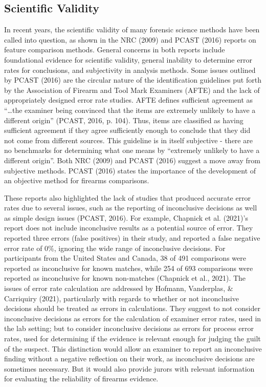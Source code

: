 \documentclass[print]{nuthesis}
\begin{document}
\hypertarget{scientific-validity}{%
\subsection{Scientific Validity}\label{scientific-validity}}

In recent years, the scientific validity of many forensic science methods have been called into question, as shown in the NRC (2009) and PCAST (2016) reports on feature comparison methods.
General concerns in both reports include foundational evidence for scientific validity, general inability to determine error rates for conclusions, and subjectivity in analysis methods.
Some issues outlined by PCAST (2016) are the circular nature of the identification guidelines put forth by the Association of Firearm and Tool Mark Examiners (AFTE) and the lack of appropriately designed error rate studies.
AFTE defines sufficient agreement as ``\ldots the examiner being convinced that the items are extremely unlikely to have a different origin'' (PCAST, 2016, p. 104).
Thus, items are classified as having sufficient agreement if they agree sufficiently enough to conclude that they did not come from different sources.
This guideline is in itself subjective - there are no benchmarks for determining what one means by ``extremely unlikely to have a different origin''.
Both NRC (2009) and PCAST (2016) suggest a move away from subjective methods.
PCAST (2016) states the importance of the development of an objective method for firearms comparisons.

These reports also highlighted the lack of studies that produced accurate error rates due to several issues, such as the reporting of inconclusive decisions as well as simple design issues (PCAST, 2016).
For example, Chapnick et al. (2021)'s report does not include inconclusive results as a potential source of error.
They reported three errors (false positives) in their study, and reported a false negative error rate of 0\%, ignoring the wide range of inconclusive decisions.
For participants from the United States and Canada, 38 of 491 comparisons were reported as inconclusive for known matches, while 254 of 693 comparisons were reported as inconclusive for known non-matches (Chapnick et al., 2021).
The issues of error rate calculation are addressed by Hofmann, Vanderplas, \& Carriquiry (2021), particularly with regards to whether or not inconclusive decisions should be treated as errors in calculations.
They suggest to not consider inconclusive decisions as errors for the calculation of examiner error rates, used in the lab setting; but to consider inconclusive decisions as errors for process error rates, used for determining if the evidence is relevant enough for judging the guilt of the suspect.
This distinction would allow an examiner to report an inconclusive finding without a negative reflection on their work, as inconclusive decisions are sometimes necessary.
But it would also provide jurors with relevant information for evaluating the reliability of firearms evidence.
\end{document}
